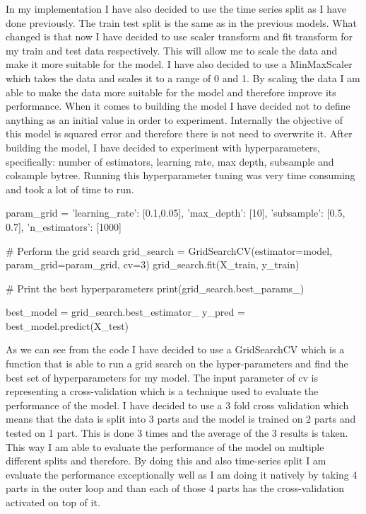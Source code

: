 \documentclass{imc-inf}
\begin{document}
	In my implementation I have also decided to use the time series split as I have done previously. The train test split is the same as in the previous models. What changed is that now I have decided to use 
	scaler transform and fit transform for my train and test data respectively. This will allow me to scale the data and make it more suitable for the model. I have also decided to use a MinMaxScaler which takes 
	the data and scales it to a range of 0 and 1. By scaling the data I am able to make the data more suitable for the model and therefore improve its performance. When it comes to building the model I have decided not to define
	anything as an initial value in order to experiment. Internally the objective of this model is squared error and therefore there is not need to overwrite it. After building the model, I have decided to 
	experiment with hyperparameters, specifically: number of estimators, learning rate, max depth, subsample and colsample bytree. Running this hyperparameter tuning was very time consuming and took a lot of time to run. 
	\begin{code}[language=Python, caption={XGBoost Hyperparameter Tuning}]
		param_grid = {
			'learning_rate': [0.1,0.05],
			'max_depth': [10],
			'subsample': [0.5, 0.7],
			'n_estimators': [1000]
		}
		
		# Perform the grid search
		grid_search = GridSearchCV(estimator=model, param_grid=param_grid, cv=3)
		grid_search.fit(X_train, y_train)
		
		# Print the best hyperparameters
		print(grid_search.best_params_)
		
		best_model = grid_search.best_estimator_
		y_pred = best_model.predict(X_test)
		
	\end{code}
	As we can see from the code I have decided to use a GridSearchCV which is a function that is able to run a grid search on the hyper-parameters and find the best set of hyperparameters for my model.
	The input parameter of cv is representing a cross-validation which is a technique used to evaluate the performance of the model. I have decided to use a 3 fold cross validation which means that the data is split into 3 parts and
	the model is trained on 2 parts and tested on 1 part. This is done 3 times and the average of the 3 results is taken. This way I am able to evaluate the performance of the model on multiple different splits and therefore.
	By doing this and also time-series split I am evaluate the performance exceptionally well as I am doing it natively by taking 4 parts in the outer loop and than each of those 4 parts has the cross-validation activated on top of it.
\end{document}
